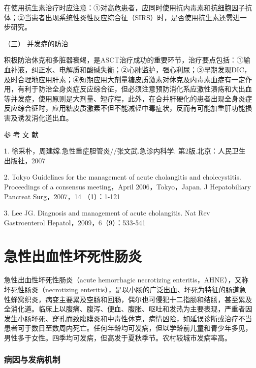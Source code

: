 在使用抗生素治疗时应注意：①对高危患者，应同时使用抗内毒素和抗细胞因子抗体；②当患者出现系统性炎性反应综合征（SIRS）时，是否使用抗生素还需进一步研究。

\hypertarget{text00322.htmlux5cux23CHP11-4-3-2-3}{}
（三） 并发症的防治

积极防治休克和多脏器衰竭，是ASCT治疗成功的重要环节，治疗要点包括：①输血补液，纠正水、电解质和酸碱失衡；②心肺监护，强心利尿；③早期发现DIC，及时合理地应用肝素；④短期应用大剂量糖皮质激素对休克及内毒素血症有一定作用，有利于防治全身炎症反应综合征，但必须注意预防消化系应激性溃疡和大出血等并发症，使用原则是大剂量、短疗程，此外，在合并肝硬化的患者出现全身炎症反应综合征时，应用糖皮质激素不但不能减轻中毒症状，反而有可能加重肝功能损害及诱发消化道出血。\protect\hypertarget{text00323.html}{}{}

\hypertarget{text00323.htmlux5cux23CHP11-4-4}{}
参 考 文 献

1. 徐采朴，周建嫦.急性重症胆管炎//张文武.急诊内科学.
第2版.北京：人民卫生出版社，2007

2. Tokyo Guidelines for the management of acute cholangitis and
cholecystitis. Proceedings of a consensus meeting，April
2006，Tokyo，Japan. J Hepatobiliary Pancreat Surg，2007，14 （1）：1-121

3. Lee JG. Diagnosis and management of acute cholangitis. Nat Rev
Gastroenterol Hepatol，2009，6（9）：533-541

\protect\hypertarget{text00324.html}{}{}

\chapter{急性出血性坏死性肠炎}

急性出血性坏死性肠炎（acute hemorrhagic necrotizing
enteritis，AHNE），又称坏死性肠炎（necrotizing
enteritis），是以小肠的广泛出血、坏死为特征的肠道急性蜂窝织炎，病变主要累及空肠和回肠，偶尔也可侵犯十二指肠和结肠，甚至累及全消化道。临床上以腹痛、腹泻、便血、腹胀、呕吐和发热为主要表现，严重者因发生小肠坏死、穿孔而致腹膜炎和中毒性休克，病情凶险，如延误诊断或治疗不当患者可于数日至数周内死亡。任何年龄均可发病，但以学龄前儿童和青少年多见，男性多于女性。四季均可发病，但高发于夏秋季节。农村较城市发病率高。

\subsection{病因与发病机制}

